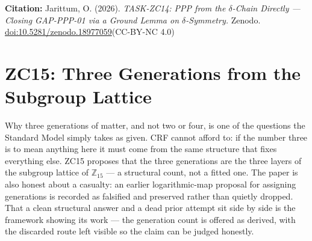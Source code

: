 \documentclass[12pt, a4paper]{article}
\begin{document}
\bigskip
\begin{center}
\textbf{Citation:} Jarittum, O. (2026).
\textit{TASK-ZC14: PPP from the $\delta$-Chain Directly ---
Closing GAP-PPP-01 via a Ground Lemma on $\delta$-Symmetry.}
Zenodo. \href{https://doi.org/10.5281/zenodo.18977059}%
{doi:10.5281/zenodo.18977059}\quad (CC-BY-NC 4.0)
\end{center}

\bigskip


\section{ZC15: Three Generations from the Subgroup Lattice}
\label{sec:zc15-generations}

Why three generations of matter, and not two or four, is one of the questions
the Standard Model simply takes as given. CRF cannot afford to: if the number
three is to mean anything here it must come from the same structure that fixes
everything else. ZC15 proposes that the three generations are the three layers of
the subgroup lattice of $\mathbb{Z}_{15}$ --- a structural count, not a fitted
one. The paper is also honest about a casualty: an earlier logarithmic-map
proposal for assigning generations is recorded as falsified and
preserved rather than quietly dropped. That a clean structural answer and a dead
prior attempt sit side by side is the framework showing its work --- the
generation count is offered as derived, with the discarded route left visible so
the claim can be judged honestly.

\end{document}
